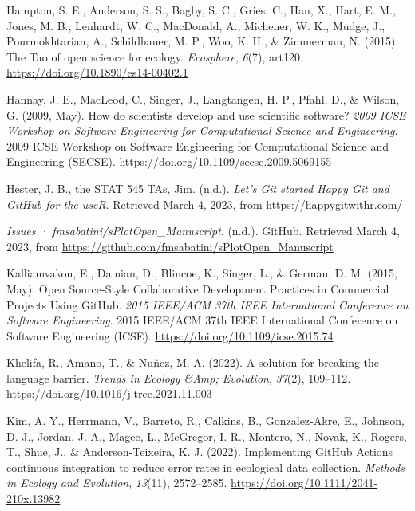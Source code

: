 \begin{CSLReferences}{1}{0}
\leavevmode{}%
Hampton, S. E., Anderson, S. S., Bagby, S. C., Gries, C., Han, X., Hart, E. M., Jones, M. B., Lenhardt, W. C., MacDonald, A., Michener, W. K., Mudge, J., Pourmokhtarian, A., Schildhauer, M. P., Woo, K. H., \& Zimmerman, N. (2015). The Tao of open science for ecology. \emph{Ecosphere}, \emph{6}(7), art120. \url{https://doi.org/10.1890/es14-00402.1}

\leavevmode{}%
Hannay, J. E., MacLeod, C., Singer, J., Langtangen, H. P., Pfahl, D., \& Wilson, G. (2009, May). How do scientists develop and use scientific software? \emph{2009 ICSE Workshop on Software Engineering for Computational Science and Engineering}. 2009 ICSE Workshop on Software Engineering for Computational Science and Engineering (SECSE). \url{https://doi.org/10.1109/secse.2009.5069155}

\leavevmode{}%
Hester, J. B., the STAT 545 TAs, Jim. (n.d.). \emph{Let's Git started \textbar{} Happy Git and GitHub for the useR}. Retrieved March 4, 2023, from \url{https://happygitwithr.com/}

\leavevmode{}%
\emph{Issues · fmsabatini/sPlotOpen\_Manuscript}. (n.d.). GitHub. Retrieved March 4, 2023, from \url{https://github.com/fmsabatini/sPlotOpen_Manuscript}

\leavevmode{}%
Kalliamvakou, E., Damian, D., Blincoe, K., Singer, L., \& German, D. M. (2015, May). Open Source-Style Collaborative Development Practices in Commercial Projects Using GitHub. \emph{2015 IEEE/ACM 37th IEEE International Conference on Software Engineering}. 2015 IEEE/ACM 37th IEEE International Conference on Software Engineering (ICSE). \url{https://doi.org/10.1109/icse.2015.74}

\leavevmode{}%
Khelifa, R., Amano, T., \& Nuñez, M. A. (2022). A solution for breaking the language barrier. \emph{Trends in Ecology \&Amp; Evolution}, \emph{37}(2), 109--112. \url{https://doi.org/10.1016/j.tree.2021.11.003}

\leavevmode{}%
Kim, A. Y., Herrmann, V., Barreto, R., Calkins, B., Gonzalez‐Akre, E., Johnson, D. J., Jordan, J. A., Magee, L., McGregor, I. R., Montero, N., Novak, K., Rogers, T., Shue, J., \& Anderson‐Teixeira, K. J. (2022). Implementing GitHub Actions continuous integration to reduce error rates in ecological data collection. \emph{Methods in Ecology and Evolution}, \emph{13}(11), 2572--2585. \url{https://doi.org/10.1111/2041-210x.13982}


\end{CSLReferences}
